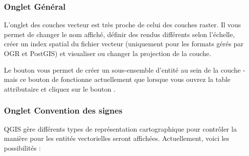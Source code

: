 \subsubsection{Onglet G\'en\'eral}\label{vectorgeneraltab}
L'onglet  des couches vecteur est tr\`es proche de celui des couches raster. Il vous permet de changer le nom affich\'e, d\'efinir des rendus diff\'erents selon l'\'echelle, cr\'eer un index spatial du fichier vecteur (uniquement pour les formats g\'er\'es par OGR et PostGIS) et visualiser ou changer la projection de la couche.

Le bouton  vous permet de cr\'eer un sous-ensemble d'entit\'e au sein de la couche - mais ce bouton de fonctionne actuellement que lorsque vous ouvrez la table attributaire et cliquez sur le bouton .

\subsubsection{Onglet Convention des signes}\label{sec:symbology}

QGIS g\`ere diff\'erents types de repr\'esentation cartographique pour contr\^oler la mani\`ere pour les entit\'es vectorielles seront affich\'ees. Actuellement, voici les possibilit\'es :

